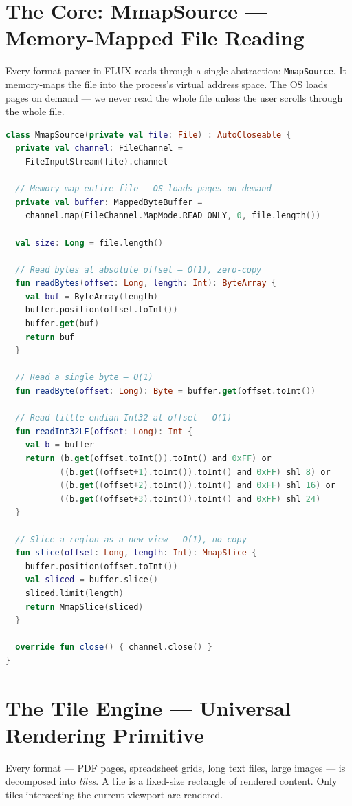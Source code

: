 \documentclass[12pt,a4paper]{report}
\begin{document}
\section{The Core: MmapSource — Memory-Mapped File Reading}

Every format parser in FLUX reads through a single abstraction:
\texttt{MmapSource}. It memory-maps the file into the process's virtual address
space. The OS loads pages on demand — we never read the whole file unless the
user scrolls through the whole file.

\begin{lstlisting}[language=Kotlin,caption={MmapSource — zero-copy file access}]
class MmapSource(private val file: File) : AutoCloseable {
  private val channel: FileChannel =
    FileInputStream(file).channel

  // Memory-map entire file — OS loads pages on demand
  private val buffer: MappedByteBuffer =
    channel.map(FileChannel.MapMode.READ_ONLY, 0, file.length())

  val size: Long = file.length()

  // Read bytes at absolute offset — O(1), zero-copy
  fun readBytes(offset: Long, length: Int): ByteArray {
    val buf = ByteArray(length)
    buffer.position(offset.toInt())
    buffer.get(buf)
    return buf
  }

  // Read a single byte — O(1)
  fun readByte(offset: Long): Byte = buffer.get(offset.toInt())

  // Read little-endian Int32 at offset — O(1)
  fun readInt32LE(offset: Long): Int {
    val b = buffer
    return (b.get(offset.toInt()).toInt() and 0xFF) or
           ((b.get((offset+1).toInt()).toInt() and 0xFF) shl 8) or
           ((b.get((offset+2).toInt()).toInt() and 0xFF) shl 16) or
           ((b.get((offset+3).toInt()).toInt() and 0xFF) shl 24)
  }

  // Slice a region as a new view — O(1), no copy
  fun slice(offset: Long, length: Int): MmapSlice {
    buffer.position(offset.toInt())
    val sliced = buffer.slice()
    sliced.limit(length)
    return MmapSlice(sliced)
  }

  override fun close() { channel.close() }
}
\end{lstlisting}

\section{The Tile Engine — Universal Rendering Primitive}

Every format — PDF pages, spreadsheet grids, long text files, large images —
is decomposed into \emph{tiles}. A tile is a fixed-size rectangle of rendered
content. Only tiles intersecting the current viewport are rendered.
\end{document}
